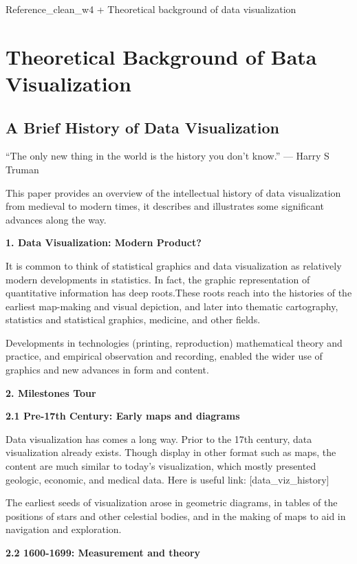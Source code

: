 \documentclass[]{book}
\theoremstyle{definition}
\theoremstyle{definition}
\theoremstyle{definition}
\theoremstyle{remark}
\begin{document}
Reference\_clean\_w4 + Theoretical background of data visualization

\section{Theoretical Background of Bata
Visualization}\label{theoretical-background-of-bata-visualization}

\subsection{A Brief History of Data
Visualization}\label{a-brief-history-of-data-visualization}

``The only new thing in the world is the history you don't know.'' ---
Harry S Truman

This paper provides an overview of the intellectual history of data
visualization from medieval to modern times, it describes and
illustrates some significant advances along the way.

\textbf{1. Data Visualization: Modern Product?}

It is common to think of statistical graphics and data visualization as
relatively modern developments in statistics. In fact, the graphic
representation of quantitative information has deep roots.These roots
reach into the histories of the earliest map-making and visual
depiction, and later into thematic cartography, statistics and
statistical graphics, medicine, and other fields.

Developments in technologies (printing, reproduction) mathematical
theory and practice, and empirical observation and recording, enabled
the wider use of graphics and new advances in form and content.

\textbf{2. Milestones Tour}

\textbf{2.1 Pre-17th Century: Early maps and diagrams}

Data visualization has comes a long way. Prior to the 17th century, data
visualization already exists. Though display in other format such as
maps, the content are much similar to today's visualization, which
mostly presented geologic, economic, and medical data. Here is useful
link: {[}data\_viz\_history{]}

The earliest seeds of visualization arose in geometric diagrams, in
tables of the positions of stars and other celestial bodies, and in the
making of maps to aid in navigation and exploration.

\textbf{2.2 1600-1699: Measurement and theory}
\end{document}
